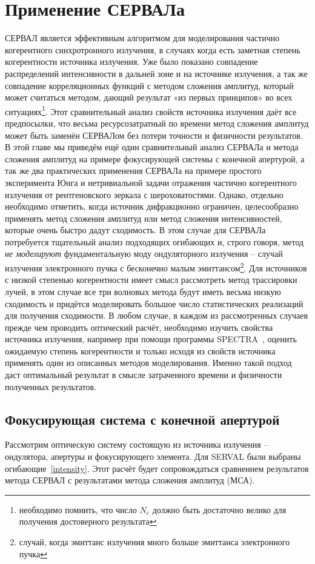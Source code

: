 \chapter{Применение СЕРВАЛа} \label{chapt3}
СЕРВАЛ является эффективным алгоритмом для моделирования частично когерентного синхротронного излучения, в случаях когда есть заметная степень когерентности источника излучения. Уже было показано совпадение распределений интенсивности в дальней зоне и на источнике излучения, а так же совпадение корреляционных функций с методом сложения амплитуд, который может считаться методом, дающий результат «из первых принципов» во всех ситуациях\footnote{необходимо помнить, что число $N_e$ должно быть достаточно велико для получения достоверного результата}. Этот сравнительный анализ свойств источника излучения даёт все предпосылки, что весьма ресурсозатратный по времени метод сложения амплитуд может быть заменён СЕРВАЛом без потери точности и физичности результатов. В этой главе мы приведём ещё один сравнительный анализ СЕРВАЛа и метода сложения амплитуд на примере фокусирующей системы с конечной апертурой, а так же два практических применения СЕРВАЛа на примере простого эксперимента Юнга и нетривиальной задачи отражения частично когерентного излучения от рентгеновского зеркала с шероховатостями. 
Однако, отдельно необходимо отметить, когда источник дифракционно ограничен, целесообразно применять метод сложения амплитуд или метод сложения интенсивностей, которые очень быстро дадут сходимость. В этом случае для СЕРВАЛа потребуется тщательный анализ подходящих огибающих и, строго говоря, метод \textit{не моделируют} фундаментальную моду ондуляторного излучения -- случай излучения электронного пучка с бесконечно малым эмиттансом\footnote{случай, когда эмиттанс излучения много больше эмиттанса электронного пучка}. Для источников с низкой степенью когерентности имеет смысл рассмотреть метод трассировки лучей, в этом случае все три волновых метода будут иметь весьма низкую сходимость и придётся моделировать большое число статистических реализаций для получения сходимости. В любом случае, в каждом из рассмотренных случаев прежде чем проводить оптический расчёт, необходимо изучить свойства источника излучения, например при помощи программы SPECTRA~\cite{tanaka_spectra_2001}, оценить ожидаемую степень когерентности и только исходя из свойств источника применять один из описанных методов моделирования. Именно такой подход даст оптимальный результат в смысле затраченного времени и физичности полученных результатов. 

\section{Фокусирующая система с конечной апертурой}\label{section:focusing_system_with_aperture}
Рассмотрим оптическую систему состоящую из источника излучения -- ондулятора, апертуры и фокусирующего элемента. Для SERVAL были выбраны огибающие~\ref{intensity}. Этот расчёт будет сопровождаться сравнением результатов метода СЕРВАЛ с результатами метода сложения амплитуд (МСА).

